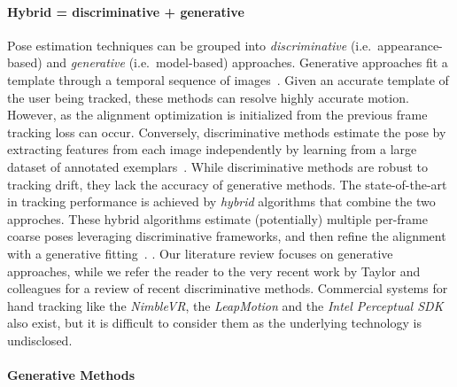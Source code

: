 

\paragraph{Hybrid = discriminative + generative}
Pose estimation techniques can be grouped into \emph{discriminative} (i.e.\ appearance-based) and \emph{generative} (i.e.\ model-based) approaches. 
Generative approaches fit a template through a temporal sequence of images~\cite{oiko2011hand,melax2013dynamics,schroder2014real,tagliasacchi2015robust}. Given an accurate template of the user being tracked, these methods can resolve highly accurate motion. However, as the alignment optimization is initialized from the previous frame tracking loss can occur. 
Conversely, discriminative methods estimate the pose by extracting features from each image independently by learning from a large dataset of annotated exemplars~\cite{keskin2012hand,tang2013real,tejani2014latent,sun2015cascaded}. While discriminative methods are robust to tracking drift, they lack the accuracy of generative methods. 
The state-of-the-art in tracking performance is achieved by \emph{hybrid} algorithms that combine the two approches. These hybrid algorithms estimate (potentially) multiple per-frame coarse poses leveraging discriminative frameworks, and then refine the alignment with a generative fitting~\cite{tompson2014real,qian2014realtime,sharp2015accurate,sridhar2015fast}. 
.
Our literature review focuses on generative approaches, while we refer the reader to the very recent work by Taylor and colleagues  for a review of recent discriminative methods. Commercial systems for hand tracking like the \emph{NimbleVR\textcopyright}, the \emph{LeapMotion\textcopyright} and the \emph{Intel Perceptual SDK\textcopyright} also exist, but it is difficult to consider them as the underlying technology is undisclosed. 

\paragraph{Generative Methods}


